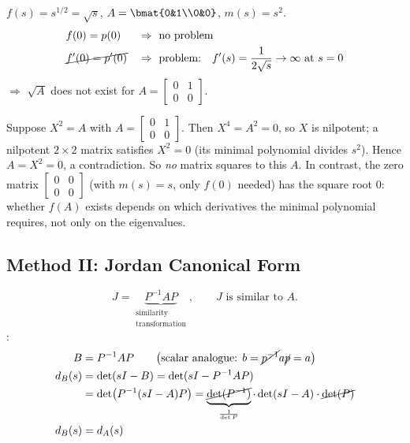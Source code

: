 \begin{example}
$f(s) = s^{1/2} = \sqrt{s}$, \qquad $A = \bmat{0&1\\0&0}$, \qquad $m(s) = s^2$.
\begin{align*}
&f(0) = p(0) && \Rightarrow\ \text{no problem}\\
&\cancel{f'(0) = p'(0)} && \Rightarrow\ \text{problem:}\quad
f'(s) = \frac{1}{2\sqrt s} \to \infty \text{ at } s = 0
\end{align*}
$\Rightarrow$ $\sqrt{A}$ does not exist for $A=\left[\begin{smallmatrix}0&1\\0&0\end{smallmatrix}\right]$.
\begin{insight}
Suppose $X^2=A$ with $A=\left[\begin{smallmatrix}0&1\\0&0\end{smallmatrix}\right]$. Then $X^4=A^2=0$, so $X$ is nilpotent; a nilpotent $2\times2$ matrix satisfies $X^2=0$ (its minimal polynomial divides $s^2$). Hence $A=X^2=0$, a contradiction. So \emph{no} matrix squares to this $A$. In contrast, the zero matrix $\left[\begin{smallmatrix}0&0\\0&0\end{smallmatrix}\right]$ (with $m(s)=s$, only $f(0)$ needed) has the square root $0$: whether $f(A)$ exists depends on which derivatives the minimal polynomial requires, not only on the eigenvalues.
\end{insight}
\end{example}

\subsection{Method II: Jordan Canonical Form}\label{ss:method2}
%
\[
J = \underbrace{P^{-1}AP}_{\substack{\text{similarity}\\ \text{transformation}}},
\qquad J \text{ is similar to } A.
\]
:
\begin{align*}
B &= P^{-1}AP \qquad \bigl(\text{scalar analogue: } b = \cancel{p^{-1}}a\cancel{p} = a\bigr)\\
d_B(s) &= \det(sI-B) = \det(sI - P^{-1}AP)\\
&= \det\bigl(P^{-1}(sI-A)P\bigr) = \underbrace{\cancel{\det(P^{-1})}}_{\frac{1}{\det P}}\cdot\det(sI-A)\cdot\cancel{\det(P)}\\
d_B(s) &= d_A(s)
\end{align*}

